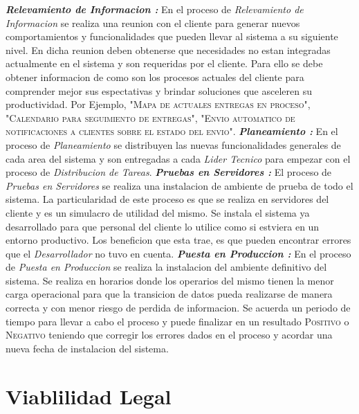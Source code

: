 \documentclass[
10pt, %
a4paper, %
oneside, %
headinclude,footinclude, %
BCOR5mm, %
]{scrartcl}
\begin{document}
\begin{flushleft}
  \textbf{ \emph{Relevamiento de Informacion : } } En el proceso de
  \textit{Relevamiento de Informacion} se realiza una reunion con el cliente
  para generar nuevos comportamientos y funcionalidades que pueden llevar al
  sistema a su siguiente nivel. En dicha reunion deben obtenerse que necesidades
  no estan integradas actualmente en el sistema y son requeridas por el cliente.
  Para ello se debe obtener informacion de como son los procesos actuales del
  cliente para comprender mejor sus espectativas y brindar soluciones que
  asceleren su productividad.
  Por Ejemplo,
  "\textsc{Mapa de actuales entregas en proceso}",
  "\textsc{Calendario para seguimiento de entregas}",
  "\textsc{Envio automatico de notificaciones a clientes sobre el estado del envio}".
  \newline  \newline
  \textbf{ \emph{Planeamiento : } } En el proceso de \textit{Planeamiento} se
  distribuyen las nuevas funcionalidades generales de cada area del sistema y
  son entregadas a cada \textit{Lider Tecnico} para empezar con el proceso de
  \textit{Distribucion de Tareas}.
  \newline  \newline
  \textbf{ \emph{Pruebas en Servidores : } } El proceso de
  \textit{Pruebas en Servidores} se realiza una instalacion de ambiente
  de prueba de todo el sistema. La particularidad de este proceso es que
  se realiza en servidores del cliente y es un simulacro de utilidad del mismo.
  Se instala el sistema ya desarrollado para que personal del cliente lo
  utilice como si estviera en un entorno productivo. Los beneficion que esta
  trae, es que pueden encontrar errores que el \textit{Desarrollador} no tuvo
  en cuenta.
  \newline  \newline
  \textbf{ \emph{Puesta en Produccion : } } En el proceso de
  \textit{Puesta en Produccion} se realiza la instalacion del ambiente
  definitivo del sistema. Se realiza en horarios donde los operarios del mismo
  tienen la menor carga operacional para que la transicion de datos pueda
  realizarse de manera correcta y con menor riesgo de perdida de informacion.
  Se acuerda un periodo de tiempo para llevar a cabo el proceso y puede
  finalizar en un resultado \textsc{Positivo} o \textsc{Negativo} teniendo
  que corregir los errores dados en el proceso y acordar una nueva fecha de
  instalacion del sistema.
  \end{flushleft}


\section{Viablilidad Legal}
\end{document}

